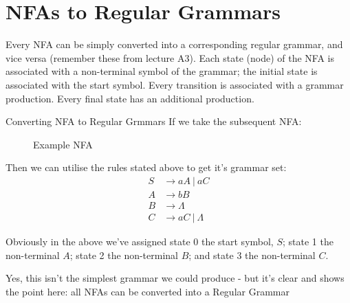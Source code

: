 
\section{NFAs to Regular Grammars}
Every NFA can be simply converted into a corresponding regular grammar, and vice versa (remember these from lecture A3). Each state (node) of the NFA is associated with a non-terminal symbol of the grammar; the initial state is associated with the start symbol. Every transition is associated with a grammar production. Every final state has an additional production.

\begin{example}{Converting NFA to Regular Grmmars}
If we take the subsequent NFA:
    \begin{figure}[H]
    \centering
    \caption{Example NFA}
    \label{fig:reglang-eg-1}
\end{figure}

Then we can utilise the rules stated above to get it's grammar set:
\begin{align*}
S & \rightarrow aA\ |\ aC\\
A & \rightarrow bB\\
B & \rightarrow \Lambda\\
C & \rightarrow aC\ |\ \Lambda
\end{align*}

Obviously in the above we've assigned state $0$ the start symbol, $S$; state 1 the non-terminal $A$; state 2 the non-terminal $B$; and state 3 the non-terminal $C$. 

Yes, this isn't the simplest grammar we could produce - but it's clear and shows the point here: all NFAs can be converted into a Regular Grammar
\end{example}

